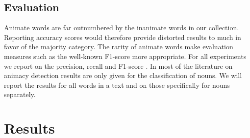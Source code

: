 \documentclass[a4paper,UKenglish]{oasics}
\begin{document}
\subsection{Evaluation}

Animate words are far outnumbered by the inanimate words in our
collection. Reporting accuracy scores would therefore provide
distorted results to much in favor of the majority category. The
rarity of animate words make evaluation measures such as the
well-known F1-score more appropriate. For all experiments we report on
the precision, recall and F1-score \cite{rijsbergen:79}. In most of
the literature on animacy detection results are only given for the
classification of nouns. We will report the results for all words in a
text and on those specifically for nouns separately.

\section{Results}
\end{document}
